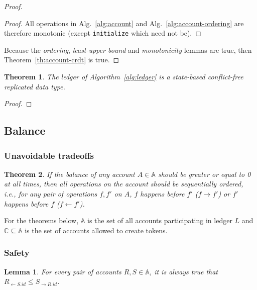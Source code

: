 \documentclass[9pt, oneside]{article}   	%
\newtheorem{theorem}{Theorem}
\newtheorem{lemma}{Lemma}
\begin{document}
\begin{proof}
\begin{proof}
All operations in Alg.~\ref{alg:account} and Alg.~\ref{alg:account-ordering} are therefore monotonic (except \texttt{initialize} which need not be).
\end{proof}

Because the \textit{ordering}, \textit{least-upper bound} and \textit{monotonicity} lemmas are true, then Theorem~\ref{th:account-crdt} is true.
\end{proof}




\begin{theorem}
\label{th:ledger-crdt}
The ledger of Algorithm~\ref{alg:ledger} is a state-based conflict-free replicated data type.
\end{theorem}

\begin{proof}

\end{proof}

\subsection{Balance}
\label{sec:proof:balance}

\subsubsection{Unavoidable tradeoffs}

\begin{theorem}
\label{proof:positive-bal-seq-order}
If the balance of any account $A \in \mathds{A}$ should be greater or equal to 0 at all times, then all operations on the account should be sequentially ordered, \textit{i.e.}, for any pair of operations $f,f'$ on $A$, $f$ happens before $f'$ ($f \rightarrow f'$) or $f'$ happens before $f$ ($f \leftarrow f'$).
\end{theorem}


For the theorems below, $\mathds{A}$ is the set of all accounts participating in ledger $L$ and $\mathds{C} \subseteq \mathds{A}$ is the set of accounts allowed to create tokens.

\subsubsection{Safety}

\begin{lemma}
For every pair of accounts $R,S \in \mathds{A}$, it is always true that $R_{\leftarrow S.id} \leq S_{\rightarrow R.id}$.
\end{lemma}
\end{document}
